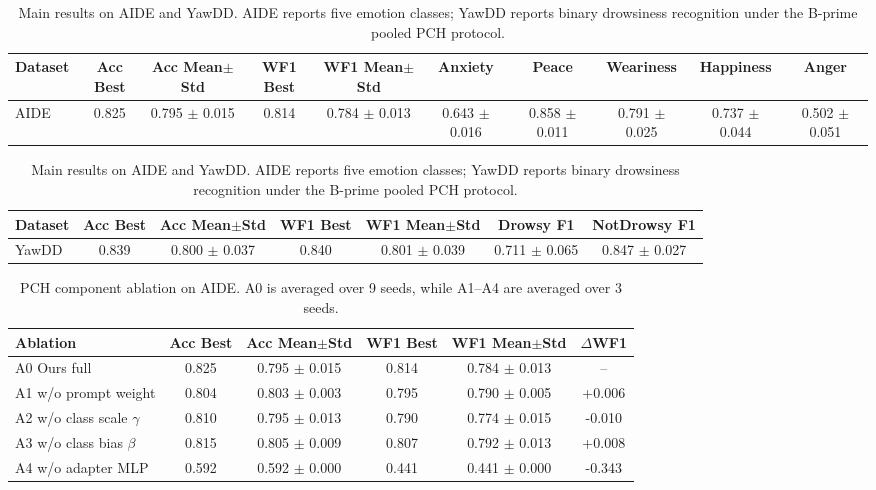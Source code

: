 
\begin{table}[t]
\centering
\caption{Main results on AIDE and YawDD. AIDE reports five emotion classes; YawDD reports binary drowsiness recognition under the B-prime pooled PCH protocol.}
\label{tab:main_results}
\begin{tabular}{lccccccccc}
\toprule
Dataset & Acc Best & Acc Mean$\pm$Std & WF1 Best & WF1 Mean$\pm$Std & Anxiety & Peace & Weariness & Happiness & Anger \\
\midrule
AIDE & 0.825 & 0.795 $\pm$ 0.015 & 0.814 & 0.784 $\pm$ 0.013 & 0.643 $\pm$ 0.016 & 0.858 $\pm$ 0.011 & 0.791 $\pm$ 0.025 & 0.737 $\pm$ 0.044 & 0.502 $\pm$ 0.051 \\
\bottomrule
\end{tabular}

\vspace{0.5em}
\begin{tabular}{lcccccc}
\toprule
Dataset & Acc Best & Acc Mean$\pm$Std & WF1 Best & WF1 Mean$\pm$Std & Drowsy F1 & NotDrowsy F1 \\
\midrule
YawDD & 0.839 & 0.800 $\pm$ 0.037 & 0.840 & 0.801 $\pm$ 0.039 & 0.711 $\pm$ 0.065 & 0.847 $\pm$ 0.027 \\
\bottomrule
\end{tabular}
\end{table}

\begin{table}[t]
\centering
\caption{PCH component ablation on AIDE. A0 is averaged over 9 seeds, while A1--A4 are averaged over 3 seeds.}
\label{tab:aide_ablation}
\begin{tabular}{lccccc}
\toprule
Ablation & Acc Best & Acc Mean$\pm$Std & WF1 Best & WF1 Mean$\pm$Std & $\Delta$WF1 \\
\midrule
A0 Ours full & 0.825 & 0.795 $\pm$ 0.015 & 0.814 & 0.784 $\pm$ 0.013 & -- \\
A1 w/o prompt weight & 0.804 & 0.803 $\pm$ 0.003 & 0.795 & 0.790 $\pm$ 0.005 & +0.006 \\
A2 w/o class scale $\gamma$ & 0.810 & 0.795 $\pm$ 0.013 & 0.790 & 0.774 $\pm$ 0.015 & -0.010 \\
A3 w/o class bias $\beta$ & 0.815 & 0.805 $\pm$ 0.009 & 0.807 & 0.792 $\pm$ 0.013 & +0.008 \\
A4 w/o adapter MLP & 0.592 & 0.592 $\pm$ 0.000 & 0.441 & 0.441 $\pm$ 0.000 & -0.343 \\
\bottomrule
\end{tabular}
\end{table}

